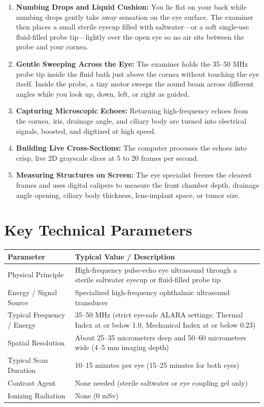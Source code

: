 \begin{enumerate}
    \item \textbf{Numbing Drops and Liquid Cushion:} You lie flat on your back while numbing drops gently take away sensation on the eye surface. The examiner then places a small sterile eyecup filled with saltwater---or a soft single-use fluid-filled probe tip---lightly over the open eye so no air sits between the probe and your cornea.
    \item \textbf{Gentle Sweeping Across the Eye:} The examiner holds the 35--50 MHz probe tip inside the fluid bath just above the cornea without touching the eye itself. Inside the probe, a tiny motor sweeps the sound beam across different angles while you look up, down, left, or right as guided.
    \item \textbf{Capturing Microscopic Echoes:} Returning high-frequency echoes from the cornea, iris, drainage angle, and ciliary body are turned into electrical signals, boosted, and digitized at high speed.
    \item \textbf{Building Live Cross-Sections:} The computer processes the echoes into crisp, live 2D grayscale slices at 5 to 20 frames per second.
    \item \textbf{Measuring Structures on Screen:} The eye specialist freezes the clearest frames and uses digital calipers to measure the front chamber depth, drainage angle opening, ciliary body thickness, lens-implant space, or tumor size.
\end{enumerate}

\section{Key Technical Parameters}

\noindent
\begin{tabularx}{\textwidth}{@{}l X@{}}
\toprule
\textbf{Parameter} & \textbf{Typical Value / Description} \\
\midrule
Physical Principle & High-frequency pulse-echo eye ultrasound through a sterile saltwater eyecup or fluid-filled probe tip \\
Energy / Signal Source & Specialized high-frequency ophthalmic ultrasound transducer \\
Typical Frequency / Energy & 35--50 MHz (strict eye-safe ALARA settings: Thermal Index at or below 1.0, Mechanical Index at or below 0.23) \\
Spatial Resolution & About 25--35 micrometers deep and 50--60 micrometers wide (4--5 mm imaging depth) \\
Typical Scan Duration & 10--15 minutes per eye (15--25 minutes for both eyes) \\
Contrast Agent & None needed (sterile saltwater or eye coupling gel only) \\
Ionizing Radiation & None (0 mSv) \\
\bottomrule
\end{tabularx}

